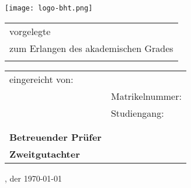 \begin{titlepage}
	\begin{center}
		\vspace*{1.5cm}
		{\Huge \textbf{\bhtTitle}}

		\vspace*{0.5cm}
		{\large \textbf{\bhtSubtitle}}

		\vspace*{1cm}
		{\texttt{[image: logo-bht.png]}}
	\end{center}

	\vspace*{2cm}
	
	\begin{tabular}{ll}
		\multicolumn{2}{l}{vorgelegte \bhtDocumentType}\\
		\multicolumn{2}{l}{zum Erlangen des akademischen Grades}\\
		\multicolumn{2}{l}{\textbf{\bhtDegree}}
	\end{tabular}

	\vspace*{0.5cm}

	\begin{tabular}{ll}
		eingereicht von: & \bhtAuthor\\
		& Matrikelnummer: \bhtMatriculationNumber\\
		& Studiengang: \bhtCourse\\
		& \bhtUniversity\\
		& \\
		\textbf{Betreuender Prüfer} & \bhtContributorFirst \\
		\textbf{Zweitgutachter} & \bhtContributorSecound
	\end{tabular}

	\vspace*{2cm}
	\bhtTown, der \today
\end{titlepage}